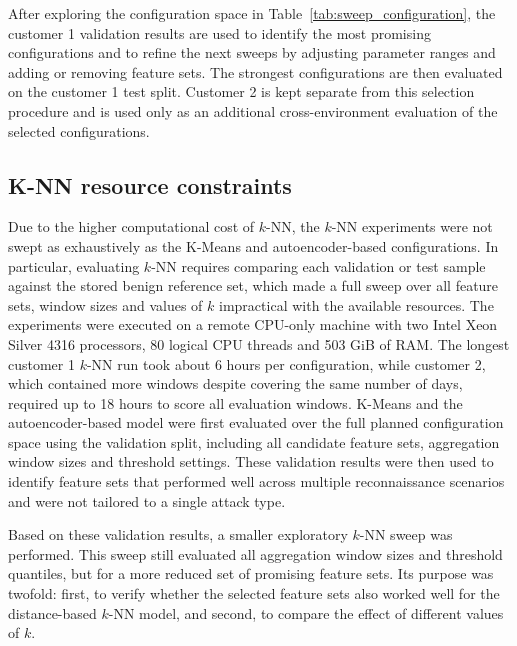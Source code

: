 
After exploring the configuration space in Table~\ref{tab:sweep_configuration}, the customer 1 validation results are used to identify the most promising configurations and to refine the next sweeps by adjusting parameter ranges and adding or removing feature sets. The strongest configurations are then evaluated on the customer 1 test split. Customer 2 is kept separate from this selection procedure and is used only as an additional cross-environment evaluation of the selected configurations.

\subsection{K-NN resource constraints}
\label{sec:knn_resource_constraints}

Due to the higher computational cost of $k$-NN, the $k$-NN experiments were not swept as exhaustively as the K-Means and autoencoder-based configurations. In particular, evaluating $k$-NN requires comparing each validation or test sample against the stored benign reference set, which made a full sweep over all feature sets, window sizes and values of $k$ impractical with the available resources. The experiments were executed on a remote CPU-only machine with two Intel Xeon Silver 4316 processors, 80 logical CPU threads and 503 GiB of RAM. The longest customer 1 $k$-NN run took about 6 hours per configuration, while customer 2, which contained more windows despite covering the same number of days, required up to 18 hours to score all evaluation windows. K-Means and the autoencoder-based model were first evaluated over the full planned configuration space using the validation split, including all candidate feature sets, aggregation window sizes and threshold settings. These validation results were then used to identify feature sets that performed well across multiple reconnaissance scenarios and were not tailored to a single attack type.

Based on these validation results, a smaller exploratory $k$-NN sweep was performed. This sweep still evaluated all aggregation window sizes and threshold quantiles, but for a more reduced set of promising feature sets. Its purpose was twofold: first, to verify whether the selected feature sets also worked well for the distance-based $k$-NN model, and second, to compare the effect of different values of $k$.

